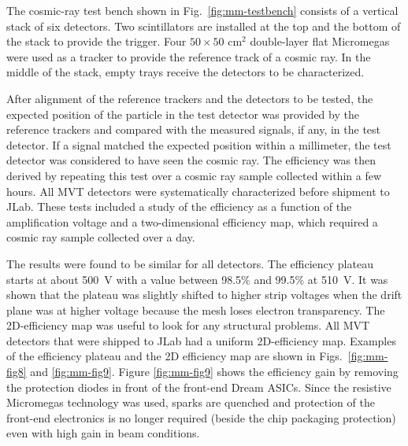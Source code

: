 The cosmic-ray test bench shown in Fig.~\ref{fig:mm-testbench} consists of a vertical stack of six detectors. Two scintillators
are installed at the top and the bottom of the stack to provide the trigger. Four $50 \times 50 \text{ cm}^2$ double-layer flat
Micromegas were used as a tracker to provide the reference track of a cosmic ray. In the middle of the stack, empty trays
receive the detectors to be characterized.

After alignment of the reference trackers and the detectors to be tested, the expected position of the particle in the test
detector was provided by the reference trackers and compared with the measured signals, if any, in the test detector. If a
signal matched the expected position within a millimeter, the test detector was considered to have seen the cosmic ray. The
efficiency was then derived by repeating this test over a cosmic ray sample collected within a few hours. All MVT detectors
were systematically characterized before shipment to JLab. These tests included a study of the efficiency as a function of
the amplification voltage and a two-dimensional efficiency map, which required a cosmic ray sample collected over a day.

The results were found to be similar for all detectors. The efficiency plateau starts at about 500~V with a value between
98.5\% and 99.5\% at 510~V. It was shown that the plateau was slightly shifted to higher strip voltages when the drift plane
was at higher voltage because the mesh loses electron transparency. The 2D-efficiency map was useful to look for any structural
problems. All MVT detectors that were shipped to JLab had a uniform 2D-efficiency map. Examples of the efficiency plateau
and the 2D efficiency map are shown in Figs.~\ref{fig:mm-fig8} and \ref{fig:mm-fig9}. Figure \ref{fig:mm-fig9} shows the
efficiency gain by removing the protection diodes in front of the front-end Dream ASICs. Since the resistive Micromegas
technology was used, sparks are quenched and protection of the front-end electronics is no longer required (beside the chip
packaging protection) even with high gain in beam conditions.

